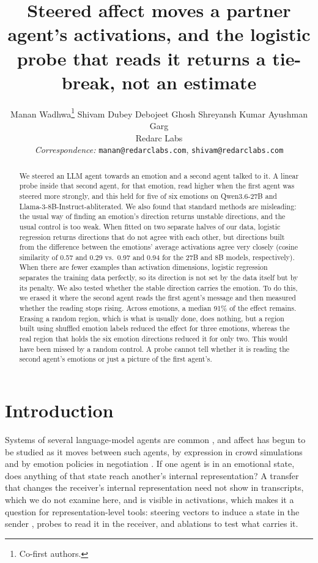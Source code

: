 \documentclass{article}
\title{Steered affect moves a partner agent's activations, and the logistic probe that reads it returns a tie-break, not an estimate}
\author{%
  Manan Wadhwa\thanks{Co-first authors.}\hspace{0.55em} Shivam Dubey\footnotemark[1]\hspace{0.55em} Debojeet Ghosh\hspace{0.55em} Shreyansh Kumar\hspace{0.55em} Ayushman Garg \\
  Redarc Labs \\
  \textit{Correspondence:} \texttt{manan@redarclabs.com}, \texttt{shivam@redarclabs.com}
}
\begin{document}
\maketitle

\begin{abstract}
We steered an LLM agent towards an emotion and a second agent talked to it. A linear probe inside that second agent, for that emotion, read higher when the first agent was steered more strongly, and this held for five of six emotions on Qwen3.6-27B and Llama-3-8B-Instruct-abliterated. We also found that standard methods are misleading: the usual way of finding an emotion's direction returns unstable directions, and the usual control is too weak. When fitted on two separate halves of our data, logistic regression returns directions that do not agree with each other, but directions built from the difference between the emotions' average activations agree very closely (cosine similarity of 0.57 and 0.29 vs.\ 0.97 and 0.94 for the 27B and 8B models, respectively). When there are fewer examples than activation dimensions, logistic regression separates the training data perfectly, so its direction is not set by the data itself but by its penalty. We also tested whether the stable direction carries the emotion. To do this, we erased it where the second agent reads the first agent's message and then measured whether the reading stops rising. Across emotions, a median 91\% of the effect remains. Erasing a random region, which is what is usually done, does nothing, but a region built using shuffled emotion labels reduced the effect for three emotions, whereas the real region that holds the six emotion directions reduced it for only two. This would have been missed by a random control. A probe cannot tell whether it is reading the second agent's emotions or just a picture of the first agent's.
\end{abstract}

\section{Introduction}
Systems of several language-model agents are common \citep{guo2024multiagent}, and affect has begun to be studied as it moves between such agents, by expression in crowd simulations \citep{durupinar2026affect} and by emotion policies in negotiation \citep{long2025evoemo}. If one agent is in an emotional state, does anything of that state reach another's internal representation? A transfer that changes the receiver's internal representation need not show in transcripts, which we do not examine here, and is visible in activations, which makes it a question for representation-level tools: steering vectors to induce a state in the sender \citep{turner2023actadd,rimsky2023caa,zou2023repe,li2023iti,sofroniew2026emotion,jeong2026emotion}, probes to read it in the receiver, and ablations to test what carries it.
\end{document}
